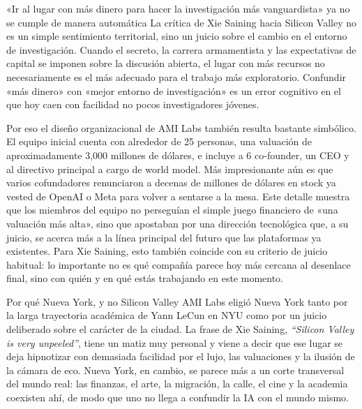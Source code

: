 \documentclass[a4paper,12pt]{article}
\begin{document}
\begin{warningbox}{«Ir al lugar con más dinero para hacer la investigación más vanguardista» ya no se cumple de manera automática}
La crítica de Xie Saining hacia Silicon Valley no es un simple sentimiento territorial, sino un juicio sobre el cambio en el entorno de investigación. Cuando el secreto, la carrera armamentista y las expectativas de capital se imponen sobre la discusión abierta, el lugar con más recursos no necesariamente es el más adecuado para el trabajo más exploratorio. Confundir «más dinero» con «mejor entorno de investigación» es un error cognitivo en el que hoy caen con facilidad no pocos investigadores jóvenes.
\end{warningbox}

Por eso el diseño organizacional de AMI Labs también resulta bastante simbólico. El equipo inicial cuenta con alrededor de 25 personas, una valuación de aproximadamente 3,000 millones de dólares, e incluye a 6 co-founder, un CEO y al directivo principal a cargo de world model. Más impresionante aún es que varios cofundadores renunciaron a decenas de millones de dólares en stock ya vested de OpenAI o Meta para volver a sentarse a la mesa. Este detalle muestra que los miembros del equipo no perseguían el simple juego financiero de «una valuación más alta», sino que apostaban por una dirección tecnológica que, a su juicio, se acerca más a la línea principal del futuro que las plataformas ya existentes. Para Xie Saining, esto también coincide con su criterio de juicio habitual: lo importante no es qué compañía parece hoy más cercana al desenlace final, sino con quién y en qué estás trabajando en este momento.

\begin{knowledgebox}{Por qué Nueva York, y no Silicon Valley}
AMI Labs eligió Nueva York tanto por la larga trayectoria académica de Yann LeCun en NYU como por un juicio deliberado sobre el carácter de la ciudad. La frase de Xie Saining, \textit{``Silicon Valley is very unpeeled''}, tiene un matiz muy personal y viene a decir que ese lugar se deja hipnotizar con demasiada facilidad por el lujo, las valuaciones y la ilusión de la cámara de eco. Nueva York, en cambio, se parece más a un corte transversal del mundo real: las finanzas, el arte, la migración, la calle, el cine y la academia coexisten ahí, de modo que uno no llega a confundir la IA con el mundo mismo.
\end{knowledgebox}
\end{document}
